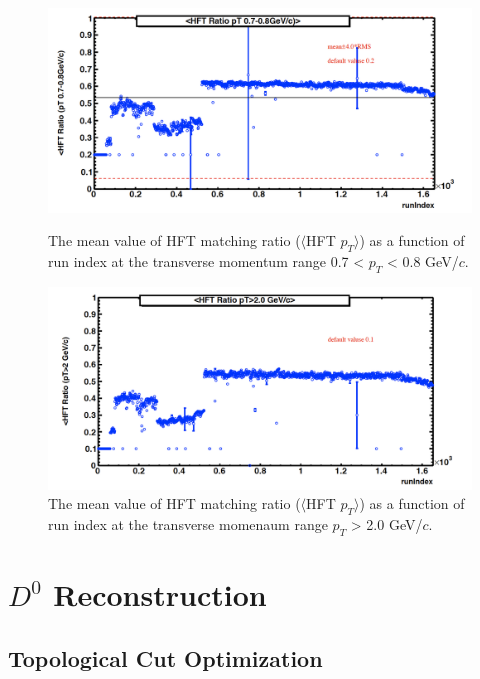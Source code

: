 \documentclass[a4paper]{article}
\begin{document}
\begin{figure}[htbp]
\begin{minipage}[htbp]{0.52\linewidth}
\centering
\includegraphics[width=1.0\textwidth]{fig/centrality_HFTratio.png}
\caption{The mean value of HFT matching ratio ($\langle$HFT $p_{T}$$\rangle$) as a function of run index at the transverse momentum range 0.7 < $p_{T}$ < 0.8 GeV/$c$.\label{centrality_QA3}}
\end{minipage}
\hfill
\begin{minipage}[htbp]{0.52\linewidth}
\centering
\includegraphics[width=1.0\textwidth]{fig/centrality_HFTratio2.png} 
\caption{The mean value of HFT matching ratio ($\langle$HFT $p_{T}$$\rangle$) as a function of run index at the transverse momenaum range $p_{T}$ > 2.0 GeV/$c$.\label{centrality_QA4}}
\end{minipage}
\end{figure}

\section{$D^0$ Reconstruction}

\subsection{Topological Cut Optimization}
\end{document}
